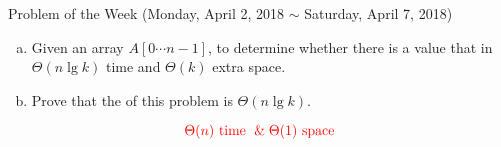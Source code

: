 
\begin{frame}{}

  \begin{columns}
  \end{columns}
\end{frame}

\begin{frame}{}
  \begin{exampleblock}{Problem of the Week (Monday, April 2, 2018 $\sim$ Saturday, April 7, 2018)}
    \begin{enumerate}[(a)]
      \item Given an array $A[0 \cdots n-1]$, to determine whether there is a value that 
	in $\Theta(n \lg k)$ time and $\Theta(k)$ extra space.
      \item Prove that the  of this problem is $\Theta(n \lg k)$.
    \end{enumerate}
  \end{exampleblock}
\end{frame}

\begin{frame}{}

  \vspace{0.30cm}
  \begin{exampleblock}{}
    \centerline{}
    \[
      \textcolor{red}{\Theta(n) \text{ time } \;\&\; \Theta(1) \text{ space}}
    \]
  \end{exampleblock}
\end{frame}

